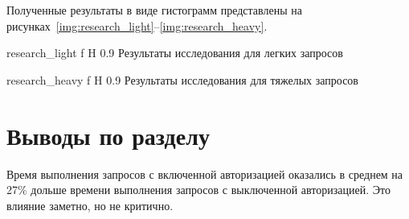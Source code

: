 Полученные результаты в виде гистограмм представлены на рисунках~\ref{img:research_light}--\ref{img:research_heavy}. 

    {research_light}
    {f}
    {H}
    {0.9\textwidth}
    {Результаты исследования для легких запросов}
    
    {research_heavy}
    {f}
    {H}
    {0.9\textwidth}
    {Результаты исследования для тяжелых запросов}

\section*{Выводы по разделу}
Время выполнения запросов с включенной авторизацией оказались в среднем на 27\% дольше времени выполнения запросов с выключенной авторизацией. Это влияние заметно, но не критично.
